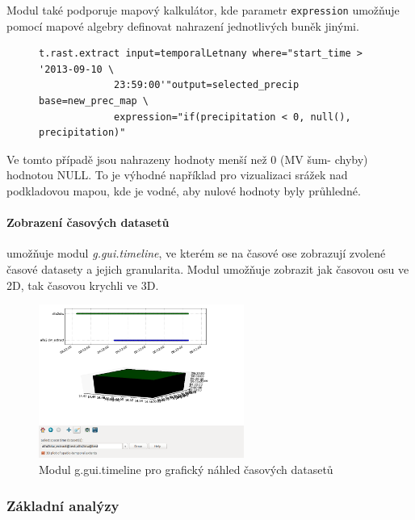 \documentclass[a4paper,12pt,oneside]{report}
\begin{document}
Modul také podporuje mapový kalkulátor, kde parametr \texttt{expression} umožňuje pomocí mapové algebry definovat nahrazení jednotlivých buněk jinými. 
\begin{figure}[h!]
\begin{footnotesize}
\lstset{extendedchars=false,
escapeinside=''}
\begin{lstlisting}[style=mybash]
t.rast.extract input=temporalLetnany where="start_time > '2013-09-10 \
             23:59:00'"output=selected_precip base=new_prec_map \
             expression="if(precipitation < 0, null(), precipitation)" 
\end{lstlisting}
\end{footnotesize} 
\end{figure}
Ve tomto případě  jsou nahrazeny hodnoty menší než 0 (MV šum- chyby) hodnotou NULL. To je výhodné například pro vizualizaci srážek nad podkladovou mapou, kde je vodné, aby nulové hodnoty byly průhledné.


\paragraph*{Zobrazení časových datasetů } umožňuje modul \emph{g.gui.timeline}, ve kterém se na časové ose zobrazují zvolené časové datasety a jejich granularita. Modul umožňuje zobrazit jak časovou osu ve 2D, tak časovou krychli ve 3D.

\begin{figure}[h!]
    \centering
    \includegraphics[width=0.6\textwidth]{./img/temporal/timeline.png}
    \caption[Timeline]{\centering  Modul g.gui.timeline pro grafický náhled časových datasetů}
 \end{figure}  


\subsubsection*{Základní analýzy}
\label{subsubsec:casoprostoranal} 
\end{document}
